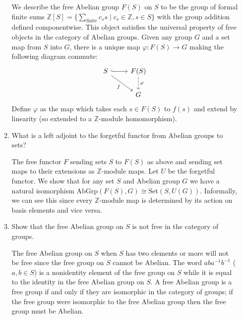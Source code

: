 \documentclass[11pt]{article}
\begin{document}
\begin{enumerate}
\begin{enumerate}[label=(\roman*)]
        We describe the free Abelian group $F(S)$ on $S$ to be the group of formal finite sums $\mathbb{Z}[S] = \{\sum_{\text{finite}} c_s s\mid c_s\in \mathbb{Z}, s\in S\}$ with the group addition defined componentwise. This object satisfies the universal property of free objects in the category of Abelian groups. Given any group $G$ and a set map from $S$ into $G$, there is a unique map $\varphi\colon F(S)\to G$ making the following diagram commute: %
        \[\begin{tikzcd}
            S & {F(S)} \\
            & G
            \arrow["f"', from=1-1, to=2-2]
            \arrow[hook, from=1-1, to=1-2]
            \arrow["\varphi", dashed, from=1-2, to=2-2]
        \end{tikzcd}\] Define $\varphi$ as the map which takes each $s\in F(S)$ to $f(s)$ and extend by linearity (so extended to a $\mathbb{Z}$-module homomorphism).
        \item What is a left adjoint to the forgetful functor from Abelian groups to sets?
        
        The free functor $F$ sending sets $S$ to $F(S)$ as above and sending set maps to their extensions as $\mathbb{Z}$-module maps. Let $U$ be the forgetful functor. We show that for any set $S$ and Abelian group $G$ we have a natural isomorphism $\text{AbGrp}(F(S), G)\cong \text{Set}(S,U(G))$. Informally, we can see this since every $\mathbb{Z}$-module map is determined by its action on basis elements and vice versa.
        \item Show that the free Abelian group on $S$ is not free in the category of groups.
        
        The free Abelian group on $S$ when $S$ has two elements or more will not be free since the free group on $S$ cannot be Abelian. The word $aba^{-1}b^{-1}$ ($a,b\in S$) is a nonidentity element of the free group on $S$ while it is equal to the identity in the free Abelian group on $S$. A free Abelian group is a free group if and only if they are isomorphic in the category of groups; if the free group were isomorphic to the free Abelian group then the free group must be Abelian.
    \end{enumerate} 
\end{enumerate}
\end{document}
